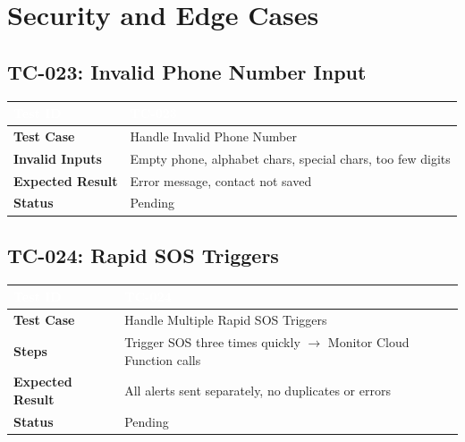 \documentclass[12pt,a4paper]{article}
\begin{document}
\newpage

\section{Security and Edge Cases}

\subsection{TC-023: Invalid Phone Number Input}
\begin{table}[h]
\centering
\setlength{\extrarowheight}{10pt}
\begin{tabularx}{\textwidth}{|l|X|}
\hline
\rowcolor{headercolor}
\textcolor{white}{\textbf{Test ID}} & \textcolor{white}{TC-023} \\
\hline
\textbf{Test Case} & Handle Invalid Phone Number \\
\hline
\textbf{Invalid Inputs} & Empty phone, alphabet chars, special chars, too few digits \\
\hline
\textbf{Expected Result} & Error message, contact not saved \\
\hline
\textbf{Status} & Pending \\
\hline
\end{tabularx}
\end{table}

\subsection{TC-024: Rapid SOS Triggers}
\begin{table}[h]
\centering
\setlength{\extrarowheight}{10pt}
\begin{tabularx}{\textwidth}{|l|X|}
\hline
\rowcolor{headercolor}
\textcolor{white}{\textbf{Test ID}} & \textcolor{white}{TC-024} \\
\hline
\textbf{Test Case} & Handle Multiple Rapid SOS Triggers \\
\hline
\textbf{Steps} & Trigger SOS three times quickly $\rightarrow$ Monitor Cloud Function calls \\
\hline
\textbf{Expected Result} & All alerts sent separately, no duplicates or errors \\
\hline
\textbf{Status} & Pending \\
\hline
\end{tabularx}
\end{table}
\end{document}
